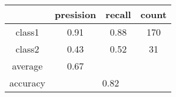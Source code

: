 
    \begin{tabular}{ | c | c | c | c | }
	\hline
	         &presision & recall & count \\ \hline
	class1   & 0.91    & 0.88  & 170 \\ \hline
	class2   & 0.43    & 0.52  & 31 \\ \hline
	average  & 0.67    &        &       \\
	\hline
	accuracy & \multicolumn{3}{c|}{0.82}\\
	\hline
    \end{tabular}